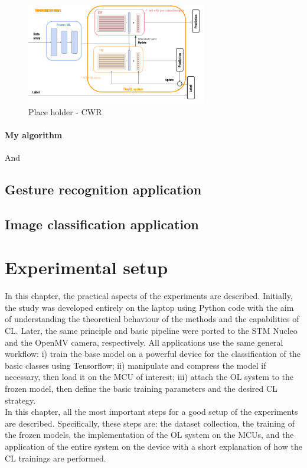 \documentclass[12pt]{report}
\begin{document}
\begin{figure}[h!]
    \centering
    \includegraphics[width=0.7\textwidth]{Figures/Chapter3/CWR.png} 
    \caption{Place holder - CWR}
    \label{fig:block_diag_CWR}    
\end{figure}

\subsubsection{My algorithm}





And


\section{Gesture recognition application}

\section{Image classification application}





\chapter{Experimental setup}

In this chapter, the practical aspects of the experiments are described. Initially, the study was developed entirely on the laptop using Python code with the aim of understanding the theoretical behaviour of the methods and the capabilities of CL. Later, the same principle and basic pipeline were ported to the STM Nucleo and the OpenMV camera, respectively. All applications use the same general workflow: i) train the base model on a powerful device for the classification of the basic classes using Tensorflow; ii) manipulate and compress the model if necessary, then load it on the MCU of interest; iii) attach the OL system to the frozen model, then define the basic training parameters and the desired CL strategy. \\
In this chapter, all the most important steps for a good setup of the experiments are described. Specifically, these steps are: the dataset collection, the training of the frozen models, the implementation of the OL system on the MCUs, and the application of the entire system on the device with a short explanation of how the CL trainings are performed.
\end{document}
